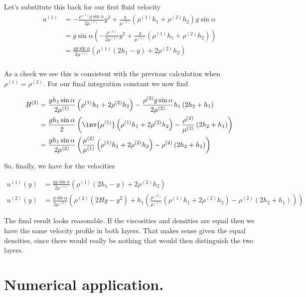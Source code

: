 Let's substitute this back for our first fluid velocity
\begin{align*}
u^{(1)} 
&= 
-\frac{\rho^{(1)} g \sin\alpha }{2 \mu^{(1)}} y^2 + 
\frac{y}{ \mu^{(1)} }
(\rho^{(1)} h_1 + \rho^{(2)} h_2 )
g \sin\alpha \\
&=
g \sin\alpha \left( 
-\frac{\rho^{(1)} }{2 \mu^{(1)}} y^2 + 
\frac{y}{ \mu^{(1)} }
(\rho^{(1)} h_1 + \rho^{(2)} h_2 )
\right) \\
&=
\frac{g y \sin\alpha}{2 \mu^{(1)}} \left( \rho^{(1) } (2 h_1 - y) +2 \rho^{(2)} h_2 \right) \\
\end{align*}

As a check we see this is consistent with the previous calculation when $\rho^{(1)} = \rho^{(2)}$.  For our final integration constant we now find

\begin{align*}
B^{(2)} 
&=
\frac{g h_1 \sin\alpha}{2 \mu^{(1)}} \left( \rho^{(1) } h_1 +2 \rho^{(2)} h_2 \right) 
-\frac{\rho^{(2)} g \sin\alpha }{2 \mu^{(2)}} h_1 \left( 2 h_2 + h_1 \right) \\
&=
\frac{g h_1 \sin\alpha}{2}
\left(
\inv{\mu^{(1)}} \left( \rho^{(1) } h_1 +2 \rho^{(2)} h_2 \right) 
-\frac{\rho^{(2)} }{\mu^{(2)}} \left( 2 h_2 + h_1 \right) 
\right) \\
&=
\frac{g h_1 \sin\alpha}{2 \mu^{(2)}}
\left(
\frac{\mu^{(2)}}{\mu^{(1)}} \left( \rho^{(1) } h_1 +2 \rho^{(2)} h_2 \right) 
- \rho^{(2)} \left( 2 h_2 + h_1 \right) 
\right) \\
\end{align*}

So, finally, we have for the velocities

\begin{align}\label{eqn:twoLayerInclinedFlowDifferentDensities:575}
u^{(1)}(y) &= \frac{g y \sin\alpha}{2 \mu^{(1)}} \left( \rho^{(1) } (2 h_1 - y) +2 \rho^{(2)} h_2 \right) \\
u^{(2)}(y) &= 
\frac{g \sin\alpha }{2 \mu^{(2)}} 
\left(
\rho^{(2)} \left( 2 H y -y^2 \right) + 
h_1 \left(
\frac{\mu^{(2)}}{\mu^{(1)}} \left( \rho^{(1) } h_1 +2 \rho^{(2)} h_2 \right) 
- \rho^{(2)} \left( 2 h_2 + h_1 \right) 
\right) 
\right)
\end{align}

The final result looks reasonable.  If the viscosities and densities are equal then we have the same velocity profile in both layers.  That makes sense given the equal densities, since there would really be nothing that would then distinguish the two layers.

\section{Numerical application.}

\EndArticle
